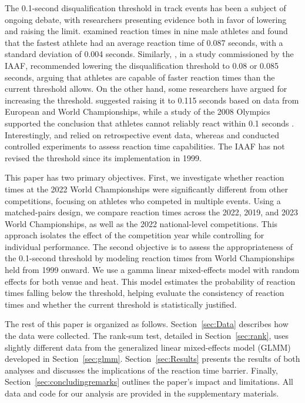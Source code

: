 \documentclass[12pt, letterpaper]{article}
\begin{document}
The 0.1-second disqualification threshold in track events has been 
a subject of ongoing debate, with researchers presenting evidence 
both in favor of lowering and raising the
limit. \citet{pain2007sprint} examined
reaction times in nine male athletes and found that the fastest athlete 
had an average reaction time of 0.087 seconds, with a standard deviation 
of 0.004 seconds. Similarly, \citet{komi2009iaaf}, in a study commissioned 
by the IAAF, recommended lowering the disqualification threshold to 0.08 
or 0.085 seconds, arguing that athletes are capable of faster reaction 
times than the current threshold allows. On the other hand, some 
researchers have argued for increasing the threshold.
\citet{brosnan2017effects} suggested raising it to 0.115 seconds based
on data from European and World Championships, while a study of the
2008 Olympics supported the conclusion that athletes cannot reliably
react within 0.1 seconds \citep{lipps2011implications}. Interestingly,
\citet{brosnan2017effects} and \citet{lipps2011implications} relied on
retrospective event data, whereas \citet{pain2007sprint} and
\citet{komi2009iaaf} conducted controlled experiments to assess
reaction time capabilities. The IAAF has not revised the threshold
since its implementation in 1999.


This paper has two primary objectives. First, we investigate whether 
reaction times at the 2022 World Championships were significantly 
different from other competitions, focusing on athletes who competed 
in multiple events. Using a matched-pairs design, we compare reaction 
times across the 2022, 2019, and 2023 World Championships, as well as 
the 2022 national-level competitions. This approach isolates the 
effect of the competition year while controlling for individual 
performance. The second objective is to assess the 
appropriateness of the 0.1-second threshold by modeling reaction 
times from World Championships held from 1999 onward. We use a gamma 
linear mixed-effects model with random effects for both venue and heat. 
This model estimates the probability of reaction times falling below 
the threshold, helping evaluate the consistency of reaction times and 
whether the current threshold is statistically justified.


The rest of this paper is organized as follows. Section~\ref{sec:Data} 
describes how the data were collected. The rank-sum test, detailed 
in Section~\ref{sec:rank}, uses slightly different data from the 
generalized linear mixed-effects model (GLMM) developed in 
Section~\ref{sec:glmm}. Section~\ref{sec:Results} presents the results 
of both analyses and discusses the implications of the reaction time 
barrier. Finally, Section~\ref{sec:concludingremarks} outlines the 
paper’s impact and limitations. All data and code for our analysis 
are provided in the supplementary materials.
\end{document}
